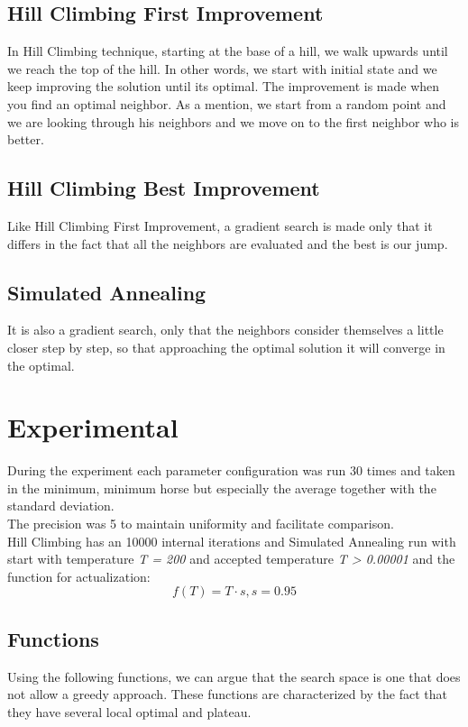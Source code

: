 \documentclass{article}
\begin{document}
\subsection{Hill Climbing First Improvement}
    In Hill Climbing technique, starting at the base of a hill, we walk upwards until we reach the top of the hill. In other words, we start with initial state and we keep improving the solution until its optimal. The improvement is made when you find an optimal neighbor.
    \newline
    As a mention, we start from a random point and we are looking through his neighbors and we move on to the first neighbor who is better.
\subsection{Hill Climbing Best Improvement}
    Like Hill Climbing First Improvement, a gradient search is made only that it differs in the fact that all the neighbors are evaluated and the best is our jump.
\subsection{Simulated Annealing}
    It is also a gradient search, only that the neighbors consider themselves a little closer step by step, so that approaching the optimal solution it will converge in the optimal.
\section{Experimental}
    During the experiment each parameter configuration was run 30 times and taken in the minimum, minimum horse but especially the average together with the standard deviation.\\
    The precision was 5 to maintain uniformity and facilitate comparison.\\
    Hill Climbing has an 10000 internal iterations and Simulated Annealing run with start with temperature \textit{T = 200} and accepted temperature \textit{T > 0.00001} and the function for actualization:
    $$f(T) = T \cdot s , s = 0.95 $$

\subsection{Functions}
    Using the following functions, we can argue that the search space is one that does not allow a greedy approach. These functions are characterized by the fact that they have several local optimal and plateau.
\end{document}
